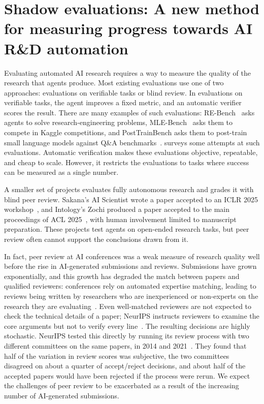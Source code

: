 \section{Shadow evaluations: A new method for measuring progress towards AI
R\&D automation}
\label{sec:shadow-evaluations}

Evaluating automated AI research requires a way to measure the quality of the research that agents produce. Most existing evaluations use one of two approaches: evaluations on verifiable tasks or blind review. In evaluations on verifiable tasks, the agent improves a fixed metric, and an automatic verifier scores the result. There are many examples of such evaluations: RE-Bench~\citep{rebench} asks agents to solve research-engineering problems, MLE-Bench~\citep{mlebench} asks them to compete in Kaggle competitions, and PostTrainBench asks them to post-train small language models against Q\&A benchmarks~\citep{posttrainbench}.  surveys some attempts at such evaluations. Automatic verification makes these evaluations objective, repeatable, and cheap to scale. However, it restricts the evaluations to tasks where success can be measured as a single number.

A smaller set of projects evaluates fully autonomous research and grades it with blind peer review. Sakana's AI Scientist wrote a paper accepted to an ICLR 2025 workshop~\citep{aiscientist2}, and Intology's Zochi produced a paper accepted to the main proceedings of ACL 2025~\citep{zochi}, with human involvement limited to manuscript preparation. These projects test agents on open-ended research tasks, but peer review often cannot support the conclusions drawn from it. 

In fact, peer review at AI conferences was a weak measure of research quality well before the rise in AI-generated submissions and reviews. Submissions have grown exponentially, and this growth has degraded the match between papers and qualified reviewers: conferences rely on automated expertise matching, leading to reviews being written by researchers who are inexperienced or non-experts on the research they are evaluating~\citep{peerreviewchallenges}. Even well-matched reviewers are not expected to check the technical details of a paper; NeurIPS instructs reviewers to examine the core arguments but not to verify every line~\citep{neurips2026reviewerguidelines}. The resulting decisions are highly stochastic. NeurIPS tested this directly by running its review process with two different committees on the same papers, in 2014 and 2021~\citep{peerreview2014,peerreview2021}. They found that half of the variation in review scores was subjective, the two committees disagreed on about a quarter of accept/reject decisions, and about half of the accepted papers would have been rejected if the process were rerun. We expect the challenges of peer review to be exacerbated as a result of the increasing number of AI-generated submissions.

